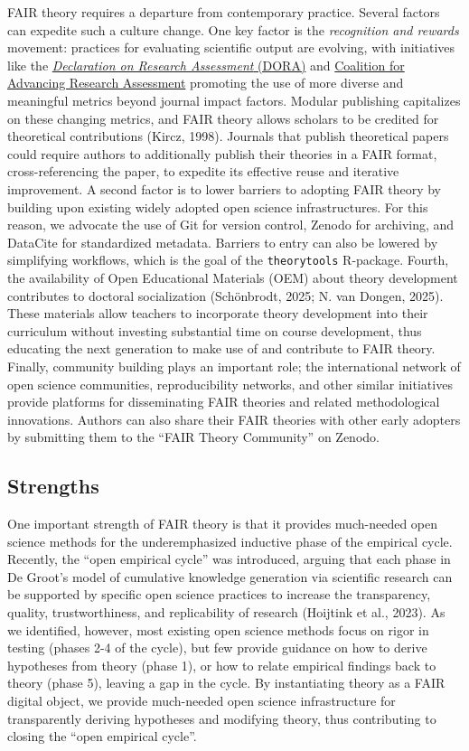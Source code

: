 \documentclass[
  man, noextraspace,floatsintext]{apa7}
\begin{document}
FAIR theory requires a departure from contemporary practice.
Several factors can expedite such a culture change.
One key factor is the \emph{recognition and rewards} movement:
practices for evaluating scientific output are evolving, with initiatives like the \href{https://sfdora.org/read/}{\emph{Declaration on Research Assessment} (DORA)} and \href{https://coara.eu/}{Coalition for Advancing Research Assessment}
promoting the use of more diverse and meaningful metrics beyond journal impact factors.
Modular publishing capitalizes on these changing metrics,
and FAIR theory allows scholars to be credited for theoretical contributions (Kircz, 1998).
Journals that publish theoretical papers could require authors to additionally publish their theories in a FAIR format, cross-referencing the paper,
to expedite its effective reuse and iterative improvement.
A second factor is to lower barriers to adopting FAIR theory by building upon existing widely adopted open science infrastructures.
For this reason, we advocate the use of Git for version control, Zenodo for archiving, and DataCite for standardized metadata.
Barriers to entry can also be lowered by simplifying workflows, which is the goal of the \texttt{theorytools} R-package.
Fourth, the availability of Open Educational Materials (OEM) about theory development contributes to doctoral socialization (Schönbrodt, 2025; N. van Dongen, 2025).
These materials allow teachers to incorporate theory development into their curriculum without investing substantial time on course development,
thus educating the next generation to make use of and contribute to FAIR theory.
Finally, community building plays an important role;
the international network of open science communities, reproducibility networks, and other similar initiatives provide platforms for disseminating FAIR theories and related methodological innovations.
Authors can also share their FAIR theories with other early adopters by submitting them to the ``FAIR Theory Community'' on Zenodo.

\subsection{Strengths}\label{strengths}

One important strength of FAIR theory is that it provides much-needed open science methods for the underemphasized inductive phase of the empirical cycle.
\label{openec}{Recently, the ``open empirical cycle'' was introduced, arguing that each phase in De Groot's model of cumulative knowledge generation via scientific research can be supported by specific open science practices to increase the transparency, quality, trustworthiness, and replicability of research (Hoijtink et al., 2023).
As we identified, however, most existing open science methods focus on rigor in testing (phases 2-4 of the cycle),
but few provide guidance on how to derive hypotheses from theory (phase 1), or how to relate empirical findings back to theory (phase 5), leaving a gap in the cycle.
By instantiating theory as a FAIR digital object,
we provide much-needed open science infrastructure for transparently deriving hypotheses and modifying theory,
thus contributing to closing the ``open empirical cycle''.}
\end{document}
